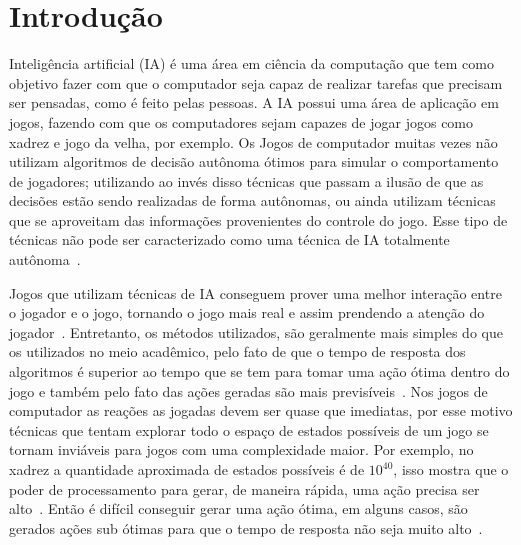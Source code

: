 \chapter{\label{chap:intro}Introdução}

Inteligência artificial (IA) é uma área em ciência da computação que tem como objetivo fazer com que o computador seja capaz de realizar tarefas que precisam ser pensadas, como é feito pelas pessoas. A IA possui uma área de aplicação em jogos, fazendo com que os computadores sejam capazes de jogar jogos como xadrez e jogo da velha, por exemplo. 
Os Jogos de computador muitas vezes não utilizam algoritmos de decisão autônoma ótimos para simular o comportamento de jogadores; utilizando ao invés disso técnicas que passam a ilusão de que as decisões estão sendo realizadas de forma autônomas, ou ainda utilizam técnicas que se aproveitam das informações provenientes do controle do jogo. Esse tipo de técnicas não pode ser caracterizado como uma técnica de IA totalmente autônoma~\cite{millington2009artificial}.

Jogos que utilizam técnicas de IA conseguem prover uma melhor interação entre o jogador e o jogo, tornando o jogo mais real e assim prendendo a atenção do jogador~\cite{millington2009artificial}.
Entretanto, os métodos utilizados, são geralmente mais simples do que os utilizados no meio acadêmico, pelo fato de que o tempo de resposta dos algoritmos é superior ao tempo que se tem para tomar uma ação ótima dentro do jogo e também pelo fato das ações geradas são mais previsíveis~\cite{intelligence2003modern}.
Nos jogos de computador as reações as jogadas devem ser quase que imediatas, por esse motivo técnicas que tentam explorar todo o espaço de estados possíveis de um jogo se tornam inviáveis para jogos com uma complexidade maior.
Por exemplo, no xadrez a quantidade aproximada de estados possíveis é de $10^{40}$, isso mostra que o poder de processamento para gerar, de maneira rápida, uma ação precisa ser alto~\cite{millington2009artificial}. 
Então é difícil conseguir gerar uma ação ótima, em alguns casos, são gerados ações sub ótimas para que o tempo de resposta não seja muito alto~\cite{intelligence2003modern}. 

